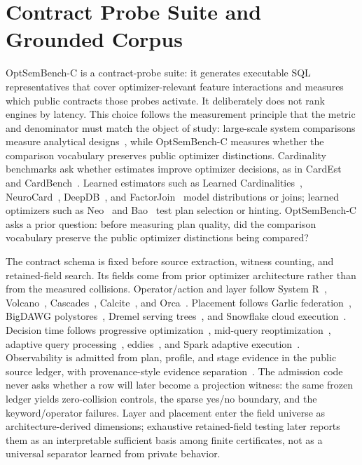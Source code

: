 \section{Contract Probe Suite and Grounded Corpus}
\label{sec:benchcorpus}
OptSemBench-C is a contract-probe suite: it generates executable SQL representatives that cover optimizer-relevant feature interactions and measures which public contracts those probes activate.  It deliberately does not rank engines by latency.  This choice follows the measurement principle that the metric and denominator must match the object of study: large-scale system comparisons measure analytical designs~\cite{pavlo2009comparison}, while OptSemBench-C measures whether the comparison vocabulary preserves public optimizer distinctions.  Cardinality benchmarks ask whether estimates improve optimizer decisions, as in CardEst~\cite{han2021cardest} and CardBench~\cite{chronis2024cardbench}.  Learned estimators such as Learned Cardinalities~\cite{kipf2019learned}, NeuroCard~\cite{yang2019neurocard}, DeepDB~\cite{hilprecht2020deepdb}, and FactorJoin~\cite{wu2023factorjoin} model distributions or joins; learned optimizers such as Neo~\cite{marcus2019neo} and Bao~\cite{marcus2021bao} test plan selection or hinting.  OptSemBench-C asks a prior question: before measuring plan quality, did the comparison vocabulary preserve the public optimizer distinctions being compared?

The contract schema is fixed before source extraction, witness counting, and retained-field search.  Its fields come from prior optimizer architecture rather than from the measured collisions.  Operator/action and layer follow System R~\cite{selinger1979access}, Volcano~\cite{graefe1990volcano}, Cascades~\cite{graefe1995cascades}, Calcite~\cite{begoli2018calcite}, and Orca~\cite{soliman2014orca}.  Placement follows Garlic federation~\cite{carey1995garlic}, BigDAWG polystores~\cite{stonebraker2015bigdawg}, Dremel serving trees~\cite{melnik2010dremel}, and Snowflake cloud execution~\cite{dageville2016snowflake}.  Decision time follows progressive optimization~\cite{markl2004progressive}, mid-query reoptimization~\cite{kabra1998reoptimization}, adaptive query processing~\cite{deshpande2007adaptive}, eddies~\cite{avnur2000eddies}, and Spark adaptive execution~\cite{armbrust2015spark}.  Observability is admitted from plan, profile, and stage evidence in the public source ledger, with provenance-style evidence separation~\cite{green2007provenance}.  The admission code never asks whether a row will later become a projection witness: the same frozen ledger yields zero-collision controls, the sparse yes/no boundary, and the keyword/operator failures.  Layer and placement enter the field universe as architecture-derived dimensions; exhaustive retained-field testing later reports them as an interpretable sufficient basis among finite certificates, not as a universal separator learned from private behavior.

